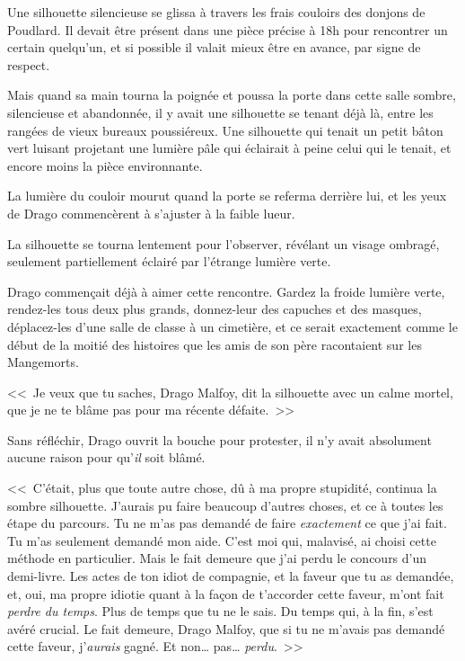 \later

Une silhouette silencieuse se glissa à travers les frais couloirs des donjons de Poudlard. Il devait être présent dans une pièce précise à 18h pour rencontrer un certain quelqu'un, et si possible il valait mieux être en avance, par signe de respect.

Mais quand sa main tourna la poignée et poussa la porte dans cette salle sombre, silencieuse et abandonnée, il y avait une silhouette se tenant déjà là, entre les rangées de vieux bureaux poussiéreux. Une silhouette qui tenait un petit bâton vert luisant projetant une lumière pâle qui éclairait à peine celui qui le tenait, et encore moins la pièce environnante.

La lumière du couloir mourut quand la porte se referma derrière lui, et les yeux de Drago commencèrent à s'ajuster à la faible lueur.

La silhouette se tourna lentement pour l'observer, révélant un visage ombragé, seulement partiellement éclairé par l'étrange lumière verte.

Drago commençait déjà à aimer cette rencontre. Gardez la froide lumière verte, rendez-les tous deux plus grands, donnez-leur des capuches et des masques, déplacez-les d'une salle de classe à un cimetière, et ce serait exactement comme le début de la moitié des histoires que les amis de son père racontaient sur les Mangemorts.

<<~Je veux que tu saches, Drago Malfoy, dit la silhouette avec un calme mortel, que je ne te blâme pas pour ma récente défaite.~>>

Sans réfléchir, Drago ouvrit la bouche pour protester, il n'y avait absolument aucune raison pour qu'\emph{il} soit blâmé.

<<~C'était, plus que toute autre chose, dû à ma propre stupidité, continua la sombre silhouette. J'aurais pu faire beaucoup d'autres choses, et ce à toutes les étape du parcours. Tu ne m'as pas demandé de faire \emph{exactement} ce que j'ai fait. Tu m'as seulement demandé mon aide. C'est moi qui, malavisé, ai choisi cette méthode en particulier. Mais le fait demeure que j'ai perdu le concours d'un demi-livre. Les actes de ton idiot de compagnie, et la faveur que tu as demandée, et, oui, ma propre idiotie quant à la façon de t'accorder cette faveur, m'ont fait \emph{perdre du temps}. Plus de temps que tu ne le sais. Du temps qui, à la fin, s'est avéré crucial. Le fait demeure, Drago Malfoy, que si tu ne m'avais pas demandé cette faveur, j'\emph{aurais} gagné. Et non… pas… \emph{perdu}.~>>

